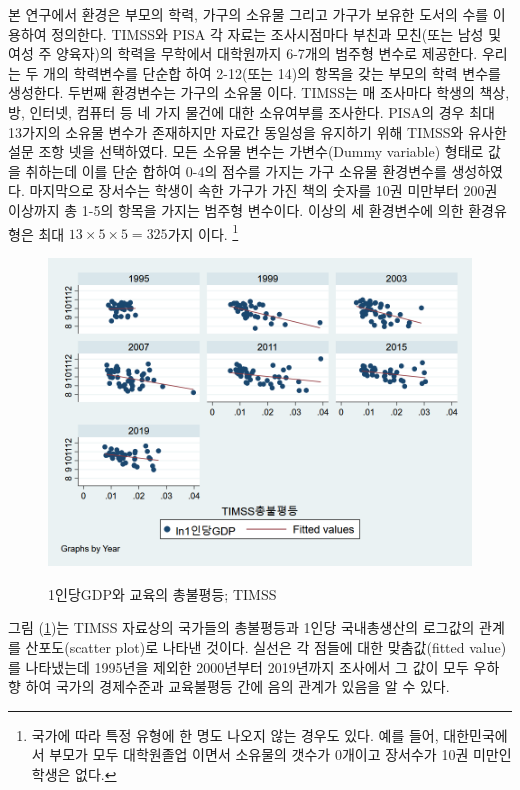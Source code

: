 본 연구에서 환경은 부모의 학력, 가구의 소유물 그리고 가구가 보유한 도서의 수를 이용하여 정의한다.
TIMSS와 PISA 각 자료는 조사시점마다 부친과 모친(또는 남성 및 여성 주 양육자)의 학력을 무학에서 대학원까지 6-7개의 범주형 변수로 제공한다.
우리는 두 개의 학력변수를 단순합 하여 2-12(또는 14)의 항목을 갖는 부모의 학력 변수를 생성한다.
두번째 환경변수는 가구의 소유물 이다.
TIMSS는 매 조사마다 학생의 책상, 방, 인터넷, 컴퓨터 등 네 가지 물건에 대한 소유여부를 조사한다.
PISA의 경우 최대 13가지의 소유물 변수가 존재하지만 자료간 동일성을 유지하기 위해 TIMSS와 유사한 설문 조항 넷을 선택하였다.
모든 소유물 변수는 가변수(Dummy variable) 형태로 값을 취하는데 이를 단순 합하여 0-4의 점수를 가지는 가구 소유물 환경변수를 생성하였다.
마지막으로 장서수는 학생이 속한 가구가 가진 책의 숫자를 10권 미만부터 200권 이상까지 총 1-5의 항목을 가지는 범주형 변수이다.
이상의 세 환경변수에 의한 환경유형은 최대 $13 \times 5 \times 5 = 325$가지 이다.
\footnote{국가에 따라 특정 유형에 한 명도 나오지 않는 경우도 있다.
    예를 들어, 대한민국에서 부모가 모두 대학원졸업 이면서 소유물의 갯수가 0개이고 장서수가 10권 미만인 학생은 없다.} 

\begin{figure}
    \centering
    \caption{1인당GDP와 교육의 총불평등; TIMSS}
    \includegraphics[width=\textwidth]{figure/scatter_lnpcgdp_totmath_timss.png}
    \label{fig:scatter_timss_lnpcgdp_bjtmath}
\end{figure}
그림 (\ref{fig:scatter_timss_lnpcgdp_bjtmath})는 TIMSS 자료상의 국가들의 총불평등과 1인당 국내총생산의 로그값의 관계를 산포도(scatter plot)로 나타낸 것이다.
실선은 각 점들에 대한 맞춤값(fitted value)를 나타냈는데 1995년을 제외한 2000년부터 2019년까지 조사에서 그 값이 모두 우하향 하여 국가의 경제수준과 교육불평등 간에 음의 관계가 있음을 알 수 있다. 

